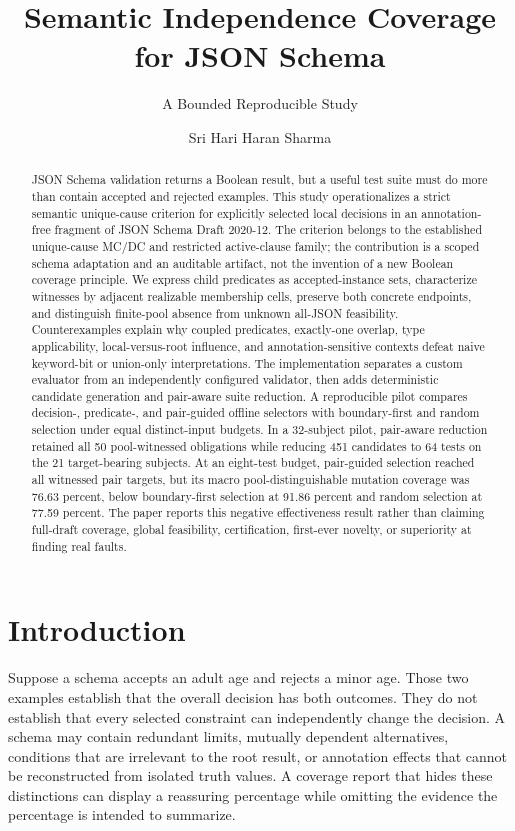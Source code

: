 \documentclass[sigconf,nonacm]{acmart}
\title{Semantic Independence Coverage for JSON Schema}
\subtitle{A Bounded Reproducible Study}
\author{Sri Hari Haran Sharma}
\begin{document}
\begin{abstract}
JSON Schema validation returns a Boolean result, but a useful test suite must do more than contain accepted and rejected examples. This study operationalizes a strict semantic unique-cause criterion for explicitly selected local decisions in an annotation-free fragment of JSON Schema Draft 2020-12. The criterion belongs to the established unique-cause MC/DC and restricted active-clause family; the contribution is a scoped schema adaptation and an auditable artifact, not the invention of a new Boolean coverage principle. We express child predicates as accepted-instance sets, characterize witnesses by adjacent realizable membership cells, preserve both concrete endpoints, and distinguish finite-pool absence from unknown all-JSON feasibility. Counterexamples explain why coupled predicates, exactly-one overlap, type applicability, local-versus-root influence, and annotation-sensitive contexts defeat naive keyword-bit or union-only interpretations. The implementation separates a custom evaluator from an independently configured validator, then adds deterministic candidate generation and pair-aware suite reduction. A reproducible pilot compares decision-, predicate-, and pair-guided offline selectors with boundary-first and random selection under equal distinct-input budgets. In a 32-subject pilot, pair-aware reduction retained all 50 pool-witnessed obligations while reducing 451 candidates to 64 tests on the 21 target-bearing subjects. At an eight-test budget, pair-guided selection reached all witnessed pair targets, but its macro pool-distinguishable mutation coverage was 76.63 percent, below boundary-first selection at 91.86 percent and random selection at 77.59 percent. The paper reports this negative effectiveness result rather than claiming full-draft coverage, global feasibility, certification, first-ever novelty, or superiority at finding real faults.

\end{abstract}
\maketitle
\section{Introduction}
Suppose a schema accepts an adult age and rejects a minor age. Those two examples establish that the overall decision has both outcomes. They do not establish that every selected constraint can independently change the decision. A schema may contain redundant limits, mutually dependent alternatives, conditions that are irrelevant to the root result, or annotation effects that cannot be reconstructed from isolated truth values. A coverage report that hides these distinctions can display a reassuring percentage while omitting the evidence the percentage is intended to summarize.
\end{document}
